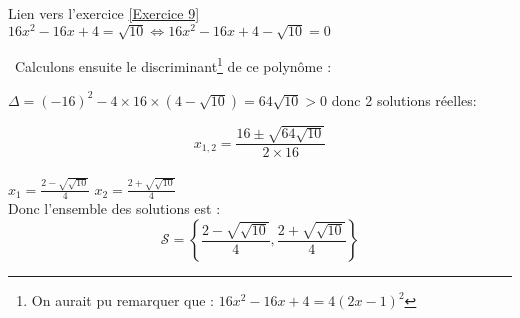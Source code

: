 \documentclass[12pt,fleqn]{report} %
\begin{document}
\begin{correction}Lien vers l'exercice   \ref{Exercice 9}\\
	$16x^2 - 16x + 4 = \sqrt{10} \iff 16x^2 - 16x + 4 - \sqrt{10} = 0$
	
	\ Calculons ensuite le discriminant\footnote{On aurait pu remarquer que : $16x^2 - 16x + 4 = 4(2x-1)^2$} de ce polynôme :
	
	$\Delta = (-16)^2 -4 \times 16 \times (4 - \sqrt{10})= 64\sqrt{10}>0$ donc 2 solutions réelles:
	
	\[
	x_{1,2} = \frac{16 \pm \sqrt{64 \sqrt{10}}}{2 \times16} 
	\]
	\\ $x_1 = \frac{2- \sqrt{ \sqrt{10}}}{4}$ \hspace{3cm}$x_2 = \frac{2+ \sqrt{ \sqrt{10}}}{4}$
	\vspace{5mm}
	\\Donc l'ensemble des solutions est :
	\[
	\mathcal{S} = \left\lbrace\frac{2-\sqrt{\sqrt{10}}}{4},\frac{2+\sqrt{\sqrt{10}}}{4}\right\rbrace
	\]
\end{correction}
\end{document}
